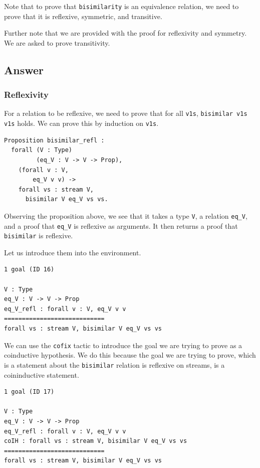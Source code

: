\documentclass{article}
\begin{document}
Note that to prove that \texttt{bisimilarity} is an equivalence relation, we need to prove that it is reflexive, symmetric, and transitive. 

Further note that we are provided with the proof for reflexivity and symmetry. We are asked to prove transitivity.

\subsection{Answer}

\subsubsection{Reflexivity}

For a relation to be reflexive, we need to prove that for all \texttt{v1s}, \texttt{bisimilar v1s v1s} holds. We can prove this by induction on \texttt{v1s}.

\begin{lstlisting}
Proposition bisimilar_refl :
  forall (V : Type)
         (eq_V : V -> V -> Prop),
    (forall v : V,
        eq_V v v) ->
    forall vs : stream V,
      bisimilar V eq_V vs vs.
\end{lstlisting}

Observing the proposition above, we see that it takes a type \texttt{V}, a relation \texttt{eq\_V}, and a proof that \texttt{eq\_V} is reflexive as arguments. It then returns a proof that \texttt{bisimilar} is reflexive.  

Let us introduce them into the environment.

\begin{lstlisting}
1 goal (ID 16)

V : Type
eq_V : V -> V -> Prop
eq_V_refl : forall v : V, eq_V v v
============================
forall vs : stream V, bisimilar V eq_V vs vs
\end{lstlisting}

We can use the \texttt{cofix} tactic to introduce the goal we are trying to prove as a coinductive hypothesis. We do this because the goal we are trying to prove, which is a statement about the \texttt{bisimilar} relation is reflexive on streams, is a coininductive statement. 

\begin{lstlisting}
1 goal (ID 17)

V : Type
eq_V : V -> V -> Prop
eq_V_refl : forall v : V, eq_V v v
coIH : forall vs : stream V, bisimilar V eq_V vs vs
============================
forall vs : stream V, bisimilar V eq_V vs vs
\end{lstlisting}
\end{document}
